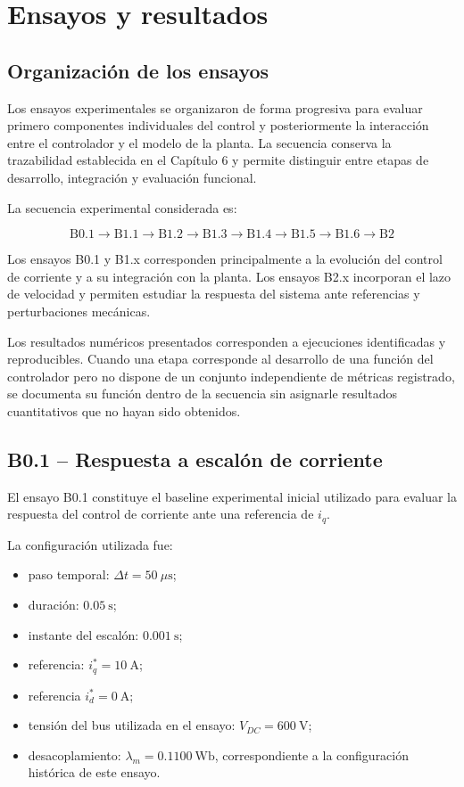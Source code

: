\section{Ensayos y resultados}

\subsection{Organización de los ensayos}

Los ensayos experimentales se organizaron de forma progresiva para evaluar primero componentes individuales del control y posteriormente la interacción entre el controlador y el modelo de la planta. La secuencia conserva la trazabilidad establecida en el Capítulo 6 y permite distinguir entre etapas de desarrollo, integración y evaluación funcional.

La secuencia experimental considerada es:

\begin{equation}
\mathrm{B0.1}
\rightarrow
\mathrm{B1.1}
\rightarrow
\mathrm{B1.2}
\rightarrow
\mathrm{B1.3}
\rightarrow
\mathrm{B1.4}
\rightarrow
\mathrm{B1.5}
\rightarrow
\mathrm{B1.6}
\rightarrow
\mathrm{B2}
\end{equation}

Los ensayos B0.1 y B1.x corresponden principalmente a la evolución del control de corriente y a su integración con la planta. Los ensayos B2.x incorporan el lazo de velocidad y permiten estudiar la respuesta del sistema ante referencias y perturbaciones mecánicas.

Los resultados numéricos presentados corresponden a ejecuciones identificadas y reproducibles. Cuando una etapa corresponde al desarrollo de una función del controlador pero no dispone de un conjunto independiente de métricas registrado, se documenta su función dentro de la secuencia sin asignarle resultados cuantitativos que no hayan sido obtenidos.

\subsection{B0.1 -- Respuesta a escalón de corriente}

El ensayo B0.1 constituye el baseline experimental inicial utilizado para evaluar la respuesta del control de corriente ante una referencia de \(i_q\).

La configuración utilizada fue:

\begin{itemize}
\item paso temporal: \(\Delta t=50~\mu\mathrm{s}\);
\item duración: \(0.05~\mathrm{s}\);
\item instante del escalón: \(0.001~\mathrm{s}\);
\item referencia: \(i_q^*=10~\mathrm{A}\);
\item referencia \(i_d^*=0~\mathrm{A}\);
\item tensión del bus utilizada en el ensayo: \(V_{DC}=600~\mathrm{V}\);
\item desacoplamiento: \(\lambda_m=0.1100~\mathrm{Wb}\), correspondiente a la configuración histórica de este ensayo.
\end{itemize}

